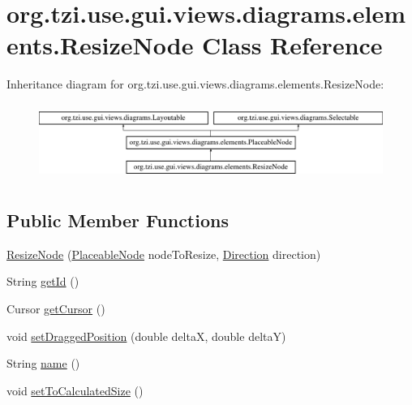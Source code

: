 \hypertarget{classorg_1_1tzi_1_1use_1_1gui_1_1views_1_1diagrams_1_1elements_1_1_resize_node}{\section{org.\-tzi.\-use.\-gui.\-views.\-diagrams.\-elements.\-Resize\-Node Class Reference}
\label{classorg_1_1tzi_1_1use_1_1gui_1_1views_1_1diagrams_1_1elements_1_1_resize_node}
}
Inheritance diagram for org.\-tzi.\-use.\-gui.\-views.\-diagrams.\-elements.\-Resize\-Node\-:\begin{figure}[H]
\begin{center}
\leavevmode
\includegraphics[height=2.514970cm]{classorg_1_1tzi_1_1use_1_1gui_1_1views_1_1diagrams_1_1elements_1_1_resize_node}
\end{center}
\end{figure}
\subsection*{Public Member Functions}
\begin{DoxyCompactItemize}
\item 
\hyperlink{classorg_1_1tzi_1_1use_1_1gui_1_1views_1_1diagrams_1_1elements_1_1_resize_node_af67bfbc1a6a8e9af443d3cd5817258b8}{Resize\-Node} (\hyperlink{classorg_1_1tzi_1_1use_1_1gui_1_1views_1_1diagrams_1_1elements_1_1_placeable_node}{Placeable\-Node} node\-To\-Resize, \hyperlink{enumorg_1_1tzi_1_1use_1_1gui_1_1views_1_1diagrams_1_1util_1_1_direction}{Direction} direction)
\item 
String \hyperlink{classorg_1_1tzi_1_1use_1_1gui_1_1views_1_1diagrams_1_1elements_1_1_resize_node_ac1e6694e9647efd44147ed7fee4925e4}{get\-Id} ()
\item 
Cursor \hyperlink{classorg_1_1tzi_1_1use_1_1gui_1_1views_1_1diagrams_1_1elements_1_1_resize_node_ab6944b7e8d34a58f4bd148a6a015361e}{get\-Cursor} ()
\item 
void \hyperlink{classorg_1_1tzi_1_1use_1_1gui_1_1views_1_1diagrams_1_1elements_1_1_resize_node_abb0cc6f5c563c45db5adff546a31f93c}{set\-Dragged\-Position} (double delta\-X, double delta\-Y)
\item 
String \hyperlink{classorg_1_1tzi_1_1use_1_1gui_1_1views_1_1diagrams_1_1elements_1_1_resize_node_a350c2027c2eb7bb204db744f4a3e0c7d}{name} ()
\item 
void \hyperlink{classorg_1_1tzi_1_1use_1_1gui_1_1views_1_1diagrams_1_1elements_1_1_resize_node_aa766eb55339082ce8dfbe7dba40bd0ad}{set\-To\-Calculated\-Size} ()
\end{DoxyCompactItemize}
